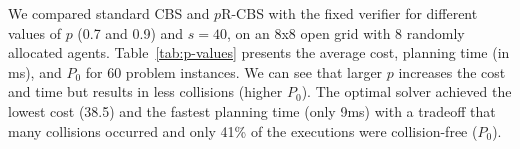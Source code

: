 \documentclass[letterpaper]{article} %
\newcommand{\prcbs}{$p$R-CBS\xspace}
\begin{document}
\begin{table}[t]
\centering
{}
\caption{Average planning cost, runtime and for CBS and \prcbs{} with different values of $p$,  over 8x8 open grid.}
\label{tab:p-values}
\end{table}


We compared standard CBS and \prcbs{} with the fixed verifier for different values of $p$ (0.7 and 0.9) and $s=40$, on an 8x8 open grid with 8 randomly allocated agents. Table~\ref{tab:p-values} presents the average cost, planning time (in ms), and $P_0$ for 60 problem instances.
We can see that larger $p$ increases the cost and time but results in less collisions (higher $P_0$). %
The optimal solver achieved the lowest cost (38.5) and the fastest planning time (only 9ms) with a tradeoff that many collisions occurred and only 41\% of the executions were collision-free ($P_0$).
\end{document}

